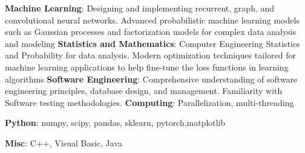 \documentclass[a4paper]{mctemplate} %
\begin{document}
\begin{sidebar}

\makepicture{2.1cm}


\begin{contacttable}


\end{contacttable}


\begin{skilltable}
	\skillitem
	{\textbf{Machine Learning}: Designing and implementing recurrent, graph, and convolutional neural networks. Advanced probabilistic machine learning models such as Gaussian processes and factorization            models for complex data                analysis and modeling}
	\skillitem
	{\textbf{Statistics and Mathematics}: Computer Engineering Statistics and 
        Probability for data analysis. Modern optimization techniques tailored for machine learning applications to help fine-tune the loss functions in learning algorithms }
	\skillitem
	{\textbf{Software Engineering}: Comprehensive understanding of software    
        engineering principles, database design, and management.
        Familiarity with Software testing methodologies.}
	\skillitem
	{\textbf{Computing}: Parallelization, multi-threading}
\end{skilltable}




\begin{codingtable}
	{\textbf{Python}: numpy, scipy, pandas, sklearn, pytorch,matplotlib}
	
	{\textbf{Misc}: C++, Visual Basic, Java}
\end{codingtable}


\end{sidebar}
\end{document}

